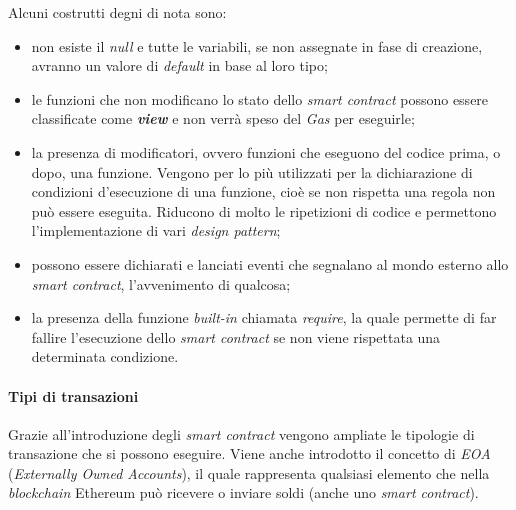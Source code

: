 Alcuni costrutti degni di nota sono:
\begin{itemize}
  \item non esiste il \textit{null} e tutte le variabili, se non assegnate in fase di creazione, avranno un valore di \textit{default} in base al loro tipo;
  \item le funzioni che non modificano lo stato dello \textit{smart contract} possono essere classificate come \textbf{\textit{view}} e non verrà speso del \textit{Gas} per eseguirle;
  \item la presenza di modificatori, ovvero funzioni che eseguono del codice prima, o dopo, una funzione. Vengono per lo più utilizzati per la dichiarazione di condizioni d'esecuzione di una funzione, cioè se non rispetta una regola non può essere eseguita. Riducono di molto le ripetizioni di codice e permettono l'implementazione di vari \textit{design pattern}; 
  \item possono essere dichiarati e lanciati eventi che segnalano al mondo esterno allo \textit{smart contract}, l'avvenimento di qualcosa;
  \item la presenza della funzione \textit{built-in} chiamata \textit{require}, la quale permette di far fallire l'esecuzione dello \textit{smart contract} se non viene rispettata una determinata condizione.
\end{itemize}

\paragraph{Tipi di transazioni}
Grazie all'introduzione degli \textit{smart contract} vengono ampliate le tipologie di transazione che si possono eseguire. Viene anche introdotto il concetto di \textit{EOA} (\textit{Externally Owned Accounts}), il quale rappresenta qualsiasi elemento che nella \textit{blockchain} Ethereum può ricevere o inviare soldi (anche uno \textit{smart contract}). \\

